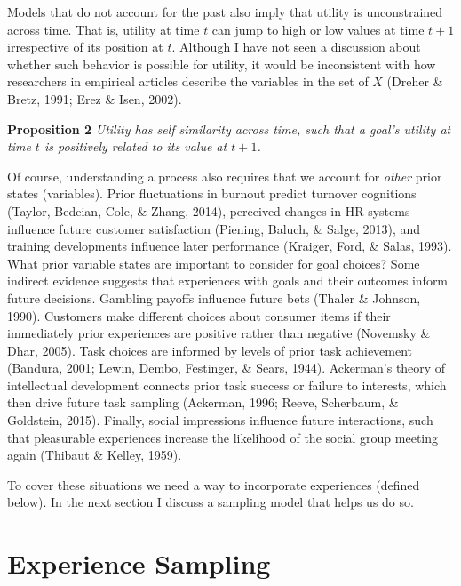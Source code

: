 \documentclass[english,man]{apa6}
\theoremstyle{definition}
\theoremstyle{definition}
\theoremstyle{definition}
\theoremstyle{remark}
\begin{document}
Models that do not account for the past also imply that utility is
unconstrained across time. That is, utility at time \(t\) can jump to
high or low values at time \(t+1\) irrespective of its position at
\(t\). Although I have not seen a discussion about whether such behavior
is possible for utility, it would be inconsistent with how researchers
in empirical articles describe the variables in the set of \(X\) (Dreher
\& Bretz, 1991; Erez \& Isen, 2002).

\textbf{Proposition 2} \emph{Utility has self similarity across time,
such that a goal's utility at time \(t\) is positively related to its
value at \(t + 1\).}

Of course, understanding a process also requires that we account for
\emph{other} prior states (variables). Prior fluctuations in burnout
predict turnover cognitions (Taylor, Bedeian, Cole, \& Zhang, 2014),
perceived changes in HR systems influence future customer satisfaction
(Piening, Baluch, \& Salge, 2013), and training developments influence
later performance (Kraiger, Ford, \& Salas, 1993). What prior variable
states are important to consider for goal choices? Some indirect
evidence suggests that experiences with goals and their outcomes inform
future decisions. Gambling payoffs influence future bets (Thaler \&
Johnson, 1990). Customers make different choices about consumer items if
their immediately prior experiences are positive rather than negative
(Novemsky \& Dhar, 2005). Task choices are informed by levels of prior
task achievement (Bandura, 2001; Lewin, Dembo, Festinger, \& Sears,
1944). Ackerman's theory of intellectual development connects prior task
success or failure to interests, which then drive future task sampling
(Ackerman, 1996; Reeve, Scherbaum, \& Goldstein, 2015). Finally, social
impressions influence future interactions, such that pleasurable
experiences increase the likelihood of the social group meeting again
(Thibaut \& Kelley, 1959).

To cover these situations we need a way to incorporate experiences
(defined below). In the next section I discuss a sampling model that
helps us do so.

\section{Experience Sampling}\label{experience-sampling}
\end{document}
